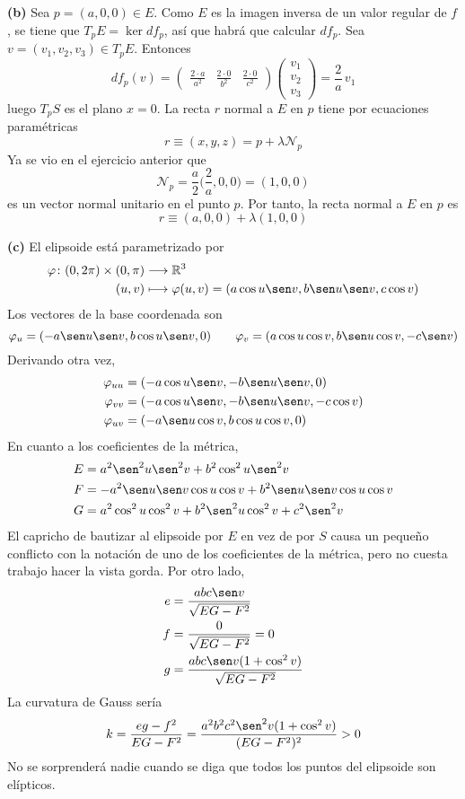 \documentclass[12pt]{report}
\newcommand{\R}{\mathbb R}
\begin{document}
\vspace{2mm}
\textbf{(b) } Sea $p = (a,0,0) \in E$. Como $E$ es la imagen inversa de un valor regular de $f$, se tiene que $T_pE = \ker df_p$, así que habrá que calcular $df_p$. Sea $v = (v_1,v_2,v_3) \in T_pE$. Entonces
\[df_p(v) = \begin{pmatrix}
    \frac{2 \cdot a}{a^2} & \frac{2 \cdot 0}{b^2} & \frac{2 \cdot 0}{c^2}
\end{pmatrix} \begin{pmatrix}
    v_1 \\
    v_2 \\
    v_3
\end{pmatrix} = \frac{2}{a} \, v_1\]
luego $T_pS$ es el plano $x = 0$. La recta $r$ normal a $E$ en $p$ tiene por ecuaciones paramétricas
\[r \equiv (x,y,z) = p + \lambda \mathcal{N}_p\]
Ya se vio en el ejercicio anterior que
\[\mathcal{N}_p = \frac{a}{2}\biggl(\frac{2}{a},0,0 \biggr) = (1,0,0)\]
es un vector normal unitario en el punto $p$. Por tanto, la recta normal a $E$ en $p$ es
\[r \equiv (a,0,0)+\lambda(1,0,0)\]

\vspace{2mm}
\textbf{(c) } El elipsoide está parametrizado por
\[
\begin{aligned}[t]
    \varphi \colon (0,2\pi) \times (0,\pi) &\longrightarrow \R^3 \\
    (u,v) &\longmapsto \varphi(u,v) = (a \cos u \sen v, b \sen u \sen v, c \cos v)
\end{aligned}
 \]
Los vectores de la base coordenada son
\[\varphi_u = (-a \sen u \sen v, b \cos u \sen v, 0) \qquad \varphi_v = (a \cos u \cos v, b \sen u \cos v, -c \sen v)\]
Derivando otra vez,
\[
\begin{aligned}[t]
    \varphi_{uu} &= (-a\cos u \sen v, -b \sen u \sen v, 0) \\
    \varphi_{vv} &= (-a \cos u \sen v, -b \sen u \sen v, -c \cos v) \\
    \varphi_{uv} & = (-a \sen u \cos v, b \cos u \cos v, 0)
\end{aligned}
\]
En cuanto a los coeficientes de la métrica,
\[
\begin{aligned}[t]
    E &= a^2 \sen^2 u \sen^2 v + b^2 \cos^2 u \sen^2 v \\
    F &= -a^2 \sen u \sen v \cos u \cos v + b^2 \sen u \sen v \cos u \cos v \\
    G &= a^2 \cos^2 u \cos^2 v + b^2 \sen^2 u \cos^2 v + c^2 \sen^2 v
\end{aligned}
\]
El capricho de bautizar al elipsoide por $E$ en vez de por $S$ causa un pequeño conflicto con la notación de uno de los coeficientes de la métrica, pero no cuesta trabajo hacer la vista gorda. Por otro lado,
\[
\begin{aligned}[t]
    e &= \frac{abc \sen v}{\sqrt{EG-F^2}}  \\
    f &= \frac{0}{\sqrt{EG-F^2}} = 0 \\
    g &= \frac{abc \sen v(1+\cos^2v)}{\sqrt{EG-F^2}}
\end{aligned}
\]
La curvatura de Gauss sería
\[k = \frac{eg-f^2}{EG-F^2} = \frac{a^2b^2c^2 \sen^2 v(1+\cos^2 v)}{(EG-F^2)^{2}} > 0\]
No se sorprenderá nadie cuando se diga que todos los puntos del elipsoide son elípticos.
\end{document}
